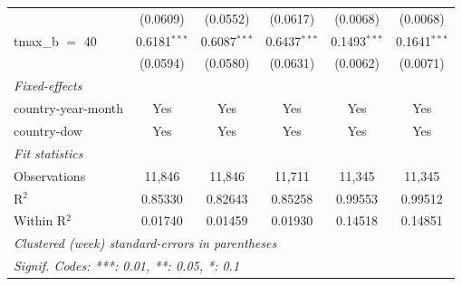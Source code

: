 \begin{tabular}{lccccc}
                        & (0.0609)           & (0.0552)           & (0.0617)        & (0.0068)        & (0.0068)\\   
   tmax\_b $=$ 40       & 0.6181$^{***}$     & 0.6087$^{***}$     & 0.6437$^{***}$  & 0.1493$^{***}$  & 0.1641$^{***}$\\   
                        & (0.0594)           & (0.0580)           & (0.0631)        & (0.0062)        & (0.0071)\\   
   \midrule
   \emph{Fixed-effects}\\
   country-year-month   & Yes                & Yes                & Yes             & Yes             & Yes\\  
   country-dow          & Yes                & Yes                & Yes             & Yes             & Yes\\  
   \midrule
   \emph{Fit statistics}\\
   Observations         & 11,846             & 11,846             & 11,711          & 11,345          & 11,345\\  
   R$^2$                & 0.85330            & 0.82643            & 0.85258         & 0.99553         & 0.99512\\  
   Within R$^2$         & 0.01740            & 0.01459            & 0.01930         & 0.14518         & 0.14851\\  
   \midrule \midrule
   \multicolumn{6}{l}{\emph{Clustered (week) standard-errors in parentheses}}\\
   \multicolumn{6}{l}{\emph{Signif. Codes: ***: 0.01, **: 0.05, *: 0.1}}\\
\end{tabular}
\par\endgroup


